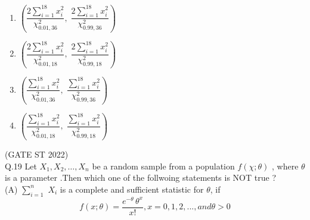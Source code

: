 \documentclass[journal,12pt,onecolumn]{IEEEtran}
\theoremstyle{remark}
\begin{document}
 \begin{multicols}{4}
\begin{enumerate}
	\item $	\left( 
	\dfrac{2 \sum_{i=1}^{18} x_i^2}{\chi^2_{0.01,36}},\;
	\dfrac{2 \sum_{i=1}^{18} x_i^2}{\chi^2_{0.99,36}} 
	\right)
	$
	\item	$
	\left( 
	\dfrac{2 \sum_{i=1}^{18} x_i^2}{\chi^2_{0.01,18}},\;
	\dfrac{2 \sum_{i=1}^{18} x_i^2}{\chi^2_{0.99,18}} 
	\right)$
	\item$ 	\left( 
	\dfrac{ \sum_{i=1}^{18} x_i^2}{\chi^2_{0.01,36}},\;
	\dfrac{ \sum_{i=1}^{18} x_i^2}{\chi^2_{0.99,36}} 
	\right)$
	\item $	\left( 
	\dfrac{\sum_{i=1}^{18} x_i^2}{\chi^2_{0.01,18}},\;
	\dfrac{\sum_{i=1}^{18} x_i^2}{\chi^2_{0.99,18}} 
	\right)$

\end{enumerate}
\end{multicols}
	\hfill (GATE ST 2022)\\
	\vspace{2em}
Q.19 Let $X_1,X_2, \dots ,X_n$ be a random sample from a population $f(\chi; \theta)$ , where $\theta$ is a parameter .Then which one of the follwoing statements is NOT true ?\\
(A) $\sum_{i=1}^{n}$ $X_i$ is a complete and sufficient  statistic for $\theta$, if \[
f(x; \theta) = 
\dfrac{e^{-\theta}\,\theta^{x}}{x!} , x = 0,1,2, ..., and \theta > 0
\]\\
\end{document}
